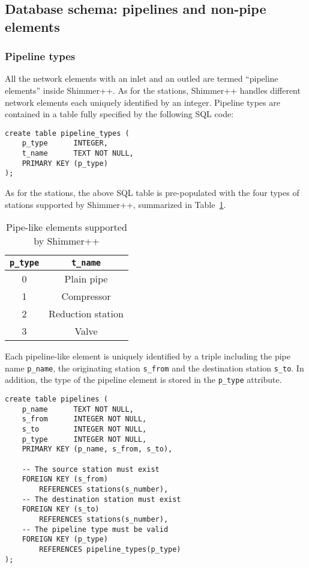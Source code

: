 \documentclass[10pt]{article}
\begin{document}
\subsection{Database schema: pipelines and non-pipe elements}
\subsubsection{Pipeline types}
All the network elements with an inlet and an outled are termed ``pipeline elements''
inside Shimmer++. As for the stations, Shimmer++ handles different network elements
each uniquely identified by an integer. Pipeline types are contained in a table
fully specified by the following SQL code:
\begin{verbatim}
create table pipeline_types (
    p_type      INTEGER,
    t_name      TEXT NOT NULL,
    PRIMARY KEY (p_type)
);
\end{verbatim}

As for the stations, the above SQL table is pre-populated with the four types
of stations supported by Shimmer++, summarized in Table~\ref{tbl:pipetypes}.
\begin{table}[ht]
    \centering
    \begin{tabular}{c|c}
        \texttt{p\_type} & \texttt{t\_name} \\
        \hline
        0 & Plain pipe \\
        1 & Compressor \\
        2 & Reduction station \\
        3 & Valve \\
    \end{tabular}
    \caption{Pipe-like elements supported by Shimmer++}
    \label{tbl:pipetypes}
\end{table}

Each pipeline-like element is uniquely identified by a triple including the pipe
name \texttt{p\_name}, the originating station \texttt{s\_from} and the destination
station \texttt{s\_to}. In addition, the type of the pipeline element is stored
in the \texttt{p\_type} attribute. 
\begin{verbatim}
create table pipelines (
    p_name      TEXT NOT NULL,
    s_from      INTEGER NOT NULL,
    s_to        INTEGER NOT NULL,    
    p_type      INTEGER NOT NULL,
    PRIMARY KEY (p_name, s_from, s_to),

    -- The source station must exist
    FOREIGN KEY (s_from)
        REFERENCES stations(s_number),
    -- The destination station must exist
    FOREIGN KEY (s_to)
        REFERENCES stations(s_number),
    -- The pipeline type must be valid
    FOREIGN KEY (p_type)
        REFERENCES pipeline_types(p_type)
);
\end{verbatim}
\end{document}
